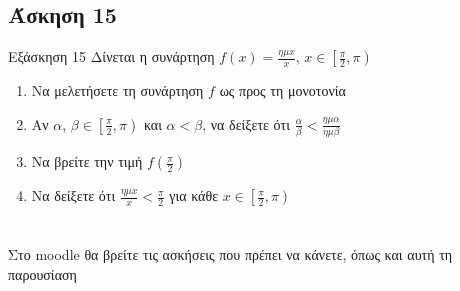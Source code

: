 \documentclass[greek]{beamer}
\begin{document}
\subsection{Άσκηση 15}
\begin{frame}[label=Άσκηση15]{Εξάσκηση 15}
  Δίνεται η συνάρτηση $f(x)=\frac{ημx}{x}$, $x\in\left[ \frac{π}{2},π \right) $
\begin{enumerate}
  \item<1-> Να μελετήσετε τη συνάρτηση $f$ ως προς τη μονοτονία
  \item<2-> Αν $α$, $β\in\left[ \frac{π}{2},π \right) $ και $α<β$, να δείξετε ότι $\frac{α}{β}<\frac{ημα}{ημβ}$
  \item<3-> Να βρείτε την τιμή $f(\frac{π}{2})$
  \item<4-> Να δείξετε ότι $\frac{ημx}{x}<\frac{π}{2}$ για κάθε $x\in\left[ \frac{π}{2},π \right) $
\end{enumerate}
\end{frame}

\section{}
\begin{frame}
 Στο moodle θα βρείτε τις ασκήσεις που πρέπει να κάνετε, όπως και αυτή τη παρουσίαση
\end{frame}

\end{document}
